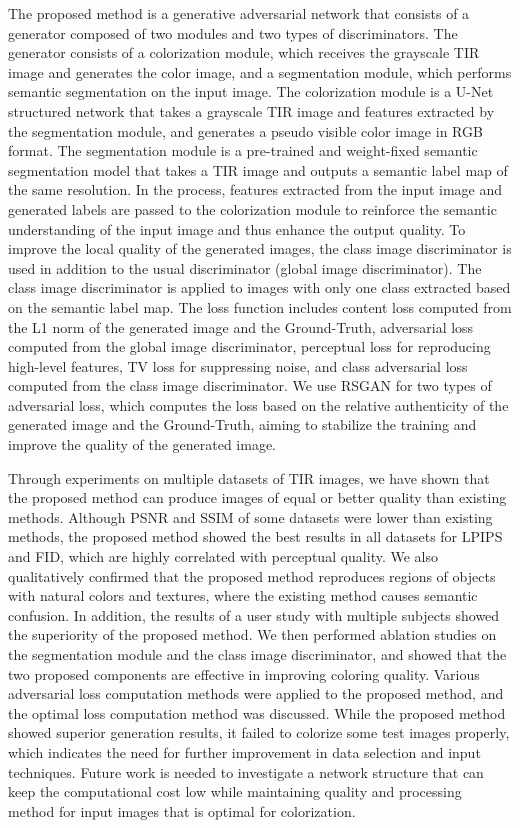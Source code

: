The proposed method is a generative adversarial network that consists of a generator composed of two modules and two types of discriminators.
The generator consists of a colorization module, which receives the grayscale TIR image and generates the color image, and a segmentation module, which performs semantic segmentation on the input image.
The colorization module is a U-Net structured network that takes a grayscale TIR image and features extracted by the segmentation module, and generates a pseudo visible color image in RGB format.
The segmentation module is a pre-trained and weight-fixed semantic segmentation model that takes a TIR image and outputs a semantic label map of the same resolution.
In the process, features extracted from the input image and generated labels are passed to the colorization module to reinforce the semantic understanding of the input image and thus enhance the output quality.
To improve the local quality of the generated images, the class image discriminator is used in addition to the usual discriminator (global image discriminator).
The class image discriminator is applied to images with only one class extracted based on the semantic label map.
The loss function includes content loss computed from the L1 norm of the generated image and the Ground-Truth, adversarial loss computed from the global image discriminator, perceptual loss for reproducing high-level features, TV loss for 
\newpage
\thispagestyle{empty}
\noindent suppressing noise, and class adversarial loss computed from the class image discriminator.
We use RSGAN for two types of adversarial loss, which computes the loss based on the relative authenticity of the generated image and the Ground-Truth, aiming to stabilize the training and improve the quality of the generated image.

Through experiments on multiple datasets of TIR images, we have shown that the proposed method can produce images of equal or better quality than existing methods.
Although PSNR and SSIM of some datasets were lower than existing methods, the proposed method showed the best results in all datasets for LPIPS and FID, which are highly correlated with perceptual quality.
We also qualitatively confirmed that the proposed method reproduces regions of objects with natural colors and textures, where the existing method causes semantic confusion.
In addition, the results of a user study with multiple subjects showed the superiority of the proposed method.
We then performed ablation studies on the segmentation module and the class image discriminator, and showed that the two proposed components are effective in improving coloring quality. 
Various adversarial loss computation methods were applied to the proposed method, and the optimal loss computation method was discussed.
While the proposed method showed superior generation results, it failed to colorize some test images properly, which indicates the need for further improvement in data selection and input techniques.
Future work is needed to investigate a network structure that can keep the computational cost low while maintaining quality and processing method for input images that is optimal for colorization.